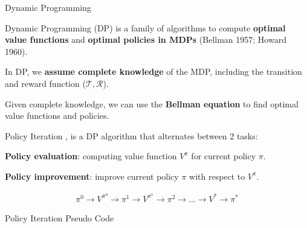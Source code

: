 \begin{frame}{Dynamic Programming}
    \blist
        \item Dynamic Programming (DP) is a family of algorithms to compute \textbf{optimal value functions} and \textbf{optimal policies in MDPs} (Bellman 1957; Howard 1960).
        \item In DP, we \textbf{assume complete knowledge} of the MDP, including the transition and reward function ($\mathcal{T}, \mathcal{R}$).
        \item Given complete knowledge, we can use the \textbf{Bellman equation} to find optimal value functions and policies.
    \elist   
\end{frame}

\begin{frame}{Policy Iteration}
    , is a DP algorithm that alternates between 2 tasks:
        \blist
            \item \textbf{Policy evaluation}: computing value function $V^{\pi}$ for current policy $\pi$.
            \item \textbf{Policy improvement}: improve current policy $\pi$ with respect to $V^{\pi}$.
        \elist 

    \begin{align*}
        \pi^{0} \to V^{\pi^{0}}\to \pi^{1} \to V^{\pi^{1} } \to\pi^{2} \to ... \to V^{*} \to \pi^{*} 
    \end{align*}

\end{frame}

\begin{frame}[fragile]{Policy Iteration Pseudo Code}
\centering
{}
\end{frame}


